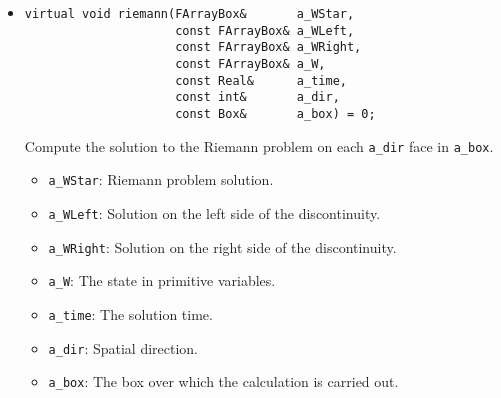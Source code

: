 \begin{itemize}
\item \begin{small}\begin{verbatim}
virtual void riemann(FArrayBox&       a_WStar,
                     const FArrayBox& a_WLeft,
                     const FArrayBox& a_WRight,
                     const FArrayBox& a_W,
                     const Real&      a_time,
                     const int&       a_dir,
                     const Box&       a_box) = 0;
\end{verbatim}\end{small}
Compute the solution to the Riemann problem on each \verb/a_dir/ face
in \verb/a_box/.
\begin{itemize}
\item \verb/a_WStar/:  Riemann problem solution.
\vspace{-0.07in}
\item \verb/a_WLeft/:  Solution on the left side of the discontinuity.
\vspace{-0.07in}
\item \verb/a_WRight/:  Solution on the right side of the discontinuity.
\vspace{-0.07in}
\item \verb/a_W/:  The state in primitive variables.
\vspace{-0.07in}
\item \verb/a_time/: The solution time.
\vspace{-0.07in}
\item \verb/a_dir/: Spatial direction.
\vspace{-0.07in}
\item \verb/a_box/:  The box over which the calculation is carried out.
\end{itemize}


\end{itemize}
